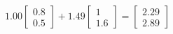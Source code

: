 \documentclass[preview]{standalone}
\begin{document}
\begin{align*}
1.00 \begin{bmatrix} 0.8 \\ 0.5 \end{bmatrix} + 1.49 \begin{bmatrix} 1 \\ 1.6 \end{bmatrix} = \begin{bmatrix} 2.29 \\ 2.89 \end{bmatrix}
\end{align*}
\end{document}
